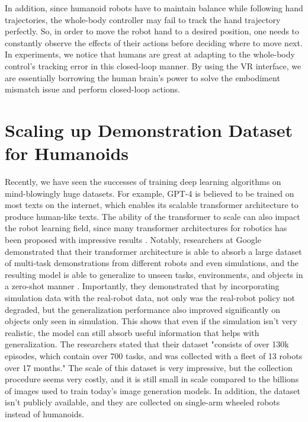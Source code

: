 In addition, since humanoid robots have to maintain balance while following hand trajectories, the whole-body controller may fail to track the hand trajectory perfectly. So, in order to move the robot hand to a desired position, one needs to constantly observe the effects of their actions before deciding where to move next. In experiments, we notice that humans are great at adapting to the whole-body control's tracking error in this closed-loop manner. By using the VR interface, we are essentially borrowing the human brain's power to solve the embodiment mismatch issue and perform closed-loop actions. 

\section{Scaling up Demonstration Dataset for Humanoids}

Recently, we have seen the successes of training deep learning algorithms on mind-blowingly huge datasets. For example, GPT-4 \cite{openai2023gpt4} is believed to be trained on most texts on the internet, which enables its scalable transformer architecture to produce human-like texts. The ability of the transformer to scale can also impact the robot learning field, since many transformer architectures for robotics has been proposed with impressive results \cite{zhu2023viola} \cite{jiang2022vima}. Notably, researchers at Google demonstrated that their transformer architecture is able to absorb a large dataset of multi-task demonstrations from different robots and even simulations, and the resulting model is able to generalize to unseen tasks, environments, and objects in a zero-shot manner \cite{brohan2022rt1}. Importantly, they demonstrated that by incorporating simulation data with the real-robot data, not only was the real-robot policy not degraded, but the generalization performance also improved significantly on objects only seen in simulation. This shows that even if the simulation isn't very realistic, the model can still absorb useful information that helps with generalization. The researchers stated that their dataset "consists of over 130k episodes, which contain over 700 tasks, and was collected with a fleet of 13 robots over 17 months." The scale of this dataset is very impressive, but the collection procedure seems very costly, and it is still small in scale compared to the billions of images used to train today's image generation models. In addition, the dataset isn't publicly available, and they are collected on single-arm wheeled robots instead of humanoids. 

